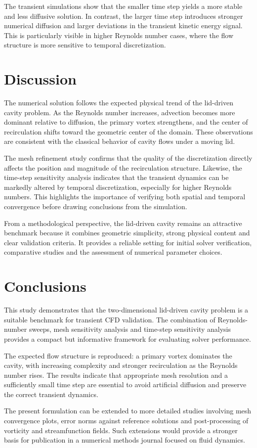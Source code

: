 \documentclass[10pt,twoside]{article}
\begin{document}
The transient simulations show that the smaller time step yields a more stable and less diffusive solution. In contrast, the larger time step introduces stronger numerical diffusion and larger deviations in the transient kinetic energy signal. This is particularly visible in higher Reynolds number cases, where the flow structure is more sensitive to temporal discretization.

\section{Discussion}

The numerical solution follows the expected physical trend of the lid-driven cavity problem. As the Reynolds number increases, advection becomes more dominant relative to diffusion, the primary vortex strengthens, and the center of recirculation shifts toward the geometric center of the domain. These observations are consistent with the classical behavior of cavity flows under a moving lid.

The mesh refinement study confirms that the quality of the discretization directly affects the position and magnitude of the recirculation structure. Likewise, the time-step sensitivity analysis indicates that the transient dynamics can be markedly altered by temporal discretization, especially for higher Reynolds numbers. This highlights the importance of verifying both spatial and temporal convergence before drawing conclusions from the simulation.

From a methodological perspective, the lid-driven cavity remains an attractive benchmark because it combines geometric simplicity, strong physical content and clear validation criteria. It provides a reliable setting for initial solver verification, comparative studies and the assessment of numerical parameter choices.

\section{Conclusions}

This study demonstrates that the two-dimensional lid-driven cavity problem is a suitable benchmark for transient CFD validation. The combination of Reynolds-number sweeps, mesh sensitivity analysis and time-step sensitivity analysis provides a compact but informative framework for evaluating solver performance.

The expected flow structure is reproduced: a primary vortex dominates the cavity, with increasing complexity and stronger recirculation as the Reynolds number rises. The results indicate that appropriate mesh resolution and a sufficiently small time step are essential to avoid artificial diffusion and preserve the correct transient dynamics.

The present formulation can be extended to more detailed studies involving mesh convergence plots, error norms against reference solutions and post-processing of vorticity and streamfunction fields. Such extensions would provide a stronger basis for publication in a numerical methods journal focused on fluid dynamics.
\end{document}
